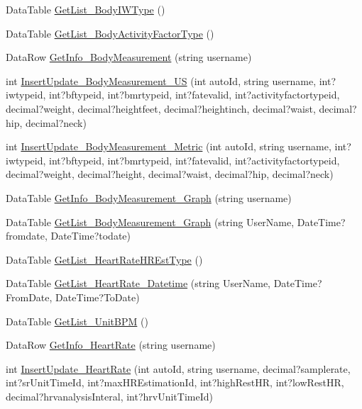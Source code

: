 \begin{DoxyCompactItemize}
\item 
Data\-Table \hyperlink{class_d_b_class_a85a6d769571f77eef926f08f7a88fe28}{Get\-List\-\_\-\-Body\-I\-W\-Type} ()
\item 
Data\-Table \hyperlink{class_d_b_class_a977ea5e7570c7bf8d20c9788161f60f6}{Get\-List\-\_\-\-Body\-Activity\-Factor\-Type} ()
\item 
Data\-Row \hyperlink{class_d_b_class_a1a96f514a3e855d11e45b296e3541b97}{Get\-Info\-\_\-\-Body\-Measurement} (string username)
\item 
int \hyperlink{class_d_b_class_a84a76caf413099a2f0f923f8a8c73f5a}{Insert\-Update\-\_\-\-Body\-Measurement\-\_\-\-U\-S} (int auto\-Id, string username, int?iwtypeid, int?bftypeid, int?bmrtypeid, int?fatevalid, int?activityfactortypeid, decimal?weight, decimal?heightfeet, decimal?heightinch, decimal?waist, decimal?hip, decimal?neck)
\item 
int \hyperlink{class_d_b_class_ac5833ce5d59ffc3703ca38bf5b337bc4}{Insert\-Update\-\_\-\-Body\-Measurement\-\_\-\-Metric} (int auto\-Id, string username, int?iwtypeid, int?bftypeid, int?bmrtypeid, int?fatevalid, int?activityfactortypeid, decimal?weight, decimal?height, decimal?waist, decimal?hip, decimal?neck)
\item 
Data\-Table \hyperlink{class_d_b_class_aa2228c10fe161653f3ee1a8938249747}{Get\-Info\-\_\-\-Body\-Measurement\-\_\-\-Graph} (string username)
\item 
Data\-Table \hyperlink{class_d_b_class_ae1b916fb79600663f47ddefb396223a1}{Get\-List\-\_\-\-Body\-Measurement\-\_\-\-Graph} (string User\-Name, Date\-Time?fromdate, Date\-Time?todate)
\item 
Data\-Table \hyperlink{class_d_b_class_aac1dfaf591ff86449a25f64d58c0c728}{Get\-List\-\_\-\-Heart\-Rate\-H\-R\-Est\-Type} ()
\item 
Data\-Table \hyperlink{class_d_b_class_a630396e518cffa1b479e83203c4010b4}{Get\-List\-\_\-\-Heart\-Rate\-\_\-\-Datetime} (string User\-Name, Date\-Time?From\-Date, Date\-Time?To\-Date)
\item 
Data\-Table \hyperlink{class_d_b_class_a9b7a23e13570beaa84677ee74d69476f}{Get\-List\-\_\-\-Unit\-B\-P\-M} ()
\item 
Data\-Row \hyperlink{class_d_b_class_a3e9f42bdd55ea3ced5e793bbbaa304e9}{Get\-Info\-\_\-\-Heart\-Rate} (string username)
\item 
int \hyperlink{class_d_b_class_aeb4a6084887a7e3c430af1513b4d7157}{Insert\-Update\-\_\-\-Heart\-Rate} (int auto\-Id, string username, decimal?samplerate, int?sr\-Unit\-Time\-Id, int?max\-H\-R\-Estimation\-Id, int?high\-Rest\-H\-R, int?low\-Rest\-H\-R, decimal?hrvanalysis\-Interal, int?hrv\-Unit\-Time\-Id)

\end{DoxyCompactItemize}
